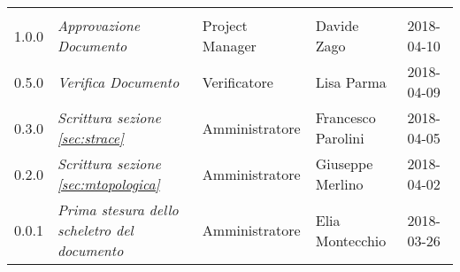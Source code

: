 \newpage 
\section*{}
\begin{table}[H]
	\centering
	\begin{tabular}{C{2cm}|C{4cm}|C{3cm}|C{3cm}|R{2cm}}
		
		 & & & & \\
		
		
			1.0.0  & \emph{Approvazione Documento} & Project Manager & Davide Zago &  2018-04-10 \\
		\hline
		
		0.5.0  & \emph{Verifica Documento} & Verificatore & Lisa Parma &  2018-04-09 \\
		\hline
		
		0.3.0 & \emph{Scrittura sezione \ref{sec:strace}} & Amministratore & Francesco Parolini &  2018-04-05 \\
		\hline
		
		0.2.0 & \emph{Scrittura sezione \ref{sec:mtopologica}} & Amministratore & Giuseppe Merlino &  2018-04-02 \\
		\hline
		
		
		0.0.1 & \emph{Prima stesura dello scheletro del documento} & Amministratore & Elia Montecchio &  2018-03-26 \\
		
		
	\end{tabular}
	
\end{table}


\clearpage